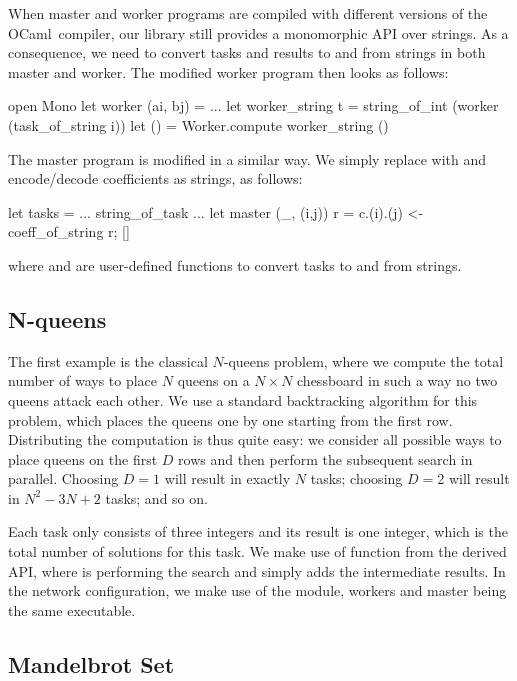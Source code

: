 \documentclass[a4paper,12pt]{article}
\newcommand{\Ocaml}{OCaml}
\begin{document}
When master and worker programs are compiled with different
versions of the \Ocaml\ compiler, our library still provides
a monomorphic API over strings. As a consequence, we need to convert
tasks and results to and from strings in both master and worker.
The modified worker program then looks as follows:
\begin{ocaml}
  open Mono
  let worker (ai, bj) = ...
  let worker_string t = string_of_int (worker (task_of_string i))
  let () = Worker.compute worker_string ()
\end{ocaml}
The master program is modified in a similar way.
We simply replace  with  and encode/decode coefficients
as strings, as follows:
\begin{ocaml}
  let tasks = ... string_of_task ...
  let master (_, (i,j)) r = c.(i).(j) <- coeff_of_string r; []
\end{ocaml}
where  and  are user-defined
functions to convert tasks to and from strings.

\subsection{N-queens}\label{sec:n-queens}

The first example is the classical $N$-queens problem, where we
compute the total number of ways to place $N$ queens on a $N\times N$
chessboard in such a way no two queens attack each other.
We use a standard backtracking algorithm for this problem, which
places the queens one by one starting from the first row.
Distributing the computation is thus quite easy: we consider all
possible ways to place queens on the first $D$ rows and then perform
the subsequent search in parallel. Choosing $D=1$ will result in
exactly $N$ tasks; choosing $D=2$ will result in $N^2-3N+2$ tasks; and
so on.

Each task only consists of three integers and its result is one integer,
which is the total number of solutions for this task.
We make use of function  from the derived API,
where  is performing the search and  simply adds the
intermediate results.
In the network configuration, we make use of the 
module, workers and master being the same executable.

\subsection{Mandelbrot Set}
\end{document}
